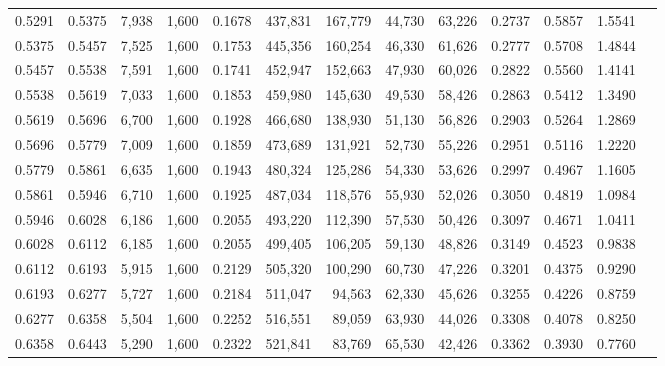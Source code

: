 \begin{tabular}{rrrrrrrrrrrrr}
0.5291 & 0.5375 &  7,938 & 1,600 &                                     0.1678 & 437,831 & 167,779 &  44,730 &  63,226 & 0.2737 & 0.5857 & 1.5541 \\
0.5375 & 0.5457 &  7,525 & 1,600 &                                     0.1753 & 445,356 & 160,254 &  46,330 &  61,626 & 0.2777 & 0.5708 & 1.4844 \\
0.5457 & 0.5538 &  7,591 & 1,600 &                                     0.1741 & 452,947 & 152,663 &  47,930 &  60,026 & 0.2822 & 0.5560 & 1.4141 \\
0.5538 & 0.5619 &  7,033 & 1,600 &                                     0.1853 & 459,980 & 145,630 &  49,530 &  58,426 & 0.2863 & 0.5412 & 1.3490 \\
0.5619 & 0.5696 &  6,700 & 1,600 &                                     0.1928 & 466,680 & 138,930 &  51,130 &  56,826 & 0.2903 & 0.5264 & 1.2869 \\
0.5696 & 0.5779 &  7,009 & 1,600 &                                     0.1859 & 473,689 & 131,921 &  52,730 &  55,226 & 0.2951 & 0.5116 & 1.2220 \\
0.5779 & 0.5861 &  6,635 & 1,600 &                                     0.1943 & 480,324 & 125,286 &  54,330 &  53,626 & 0.2997 & 0.4967 & 1.1605 \\
0.5861 & 0.5946 &  6,710 & 1,600 &                                     0.1925 & 487,034 & 118,576 &  55,930 &  52,026 & 0.3050 & 0.4819 & 1.0984 \\
0.5946 & 0.6028 &  6,186 & 1,600 &                                     0.2055 & 493,220 & 112,390 &  57,530 &  50,426 & 0.3097 & 0.4671 & 1.0411 \\
0.6028 & 0.6112 &  6,185 & 1,600 &                                     0.2055 & 499,405 & 106,205 &  59,130 &  48,826 & 0.3149 & 0.4523 & 0.9838 \\
0.6112 & 0.6193 &  5,915 & 1,600 &                                     0.2129 & 505,320 & 100,290 &  60,730 &  47,226 & 0.3201 & 0.4375 & 0.9290 \\
0.6193 & 0.6277 &  5,727 & 1,600 &                                     0.2184 & 511,047 &  94,563 &  62,330 &  45,626 & 0.3255 & 0.4226 & 0.8759 \\
0.6277 & 0.6358 &  5,504 & 1,600 &                                     0.2252 & 516,551 &  89,059 &  63,930 &  44,026 & 0.3308 & 0.4078 & 0.8250 \\
0.6358 & 0.6443 &  5,290 & 1,600 &                                     0.2322 & 521,841 &  83,769 &  65,530 &  42,426 & 0.3362 & 0.3930 & 0.7760 \\

\end{tabular}
